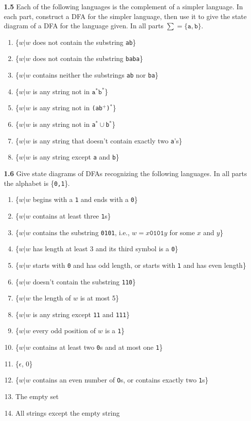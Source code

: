 \documentclass{article}
\begin{document}
\textbf{1.5} Each of the following languages is the complement of a simpler
language. In each part, construct a DFA for the simpler language, then use it to
give the state diagram of a DFA for the language given. In all parts $\sum =
\{\texttt{a}, \texttt{b}\}$.

\begin{enumerate}
\item \{$w|w$ does not contain the substring \texttt{ab}\}
\item \{$w|w$ does not contain the substring \texttt{baba}\}
\item \{$w|w$ contains neither the substrings \texttt{ab} nor \texttt{ba}\}
\item \{$w|w$ is any string not in $\texttt{a}^* \texttt{b}^*$\}
\item \{$w|w$ is any string not in \texttt{(ab$^+$)$^*$}\}
\item \{$w|w$ is any string not in \texttt{a$^*\cup$b$^*$}\}
\item \{$w|w$ is any string that doesn't contain exactly two \texttt{a}'s\}
\item \{$w|w$ is any string except \texttt{a} and \texttt{b}\}
\end{enumerate}

\textbf{1.6} Give state diagrams of DFAs recognizing the following languages. In
all parts the alphabet is \{\texttt{0,1}\}.

\begin{enumerate}
\item \{$w|w$ begins with a \texttt{1} and ends with a \texttt{0}\}
\item \{$w|w$ contains at least three \texttt{1}s\}
\item \{$w|w$ contains the substring \texttt{0101}, i.e., $w = x\texttt{0101}y$
for some $x$ and $y$\}
\item \{$w|w$ has length at least 3 and its third symbol is a \texttt{0}\}
\item \{$w|w$ starts with \texttt{0} and has odd length, or starts with
\texttt{1} and has even length\}
\item \{$w|w$ doesn't contain the substring \texttt{110}\}
\item \{$w|w$ the length of $w$ is at most 5\}
\item \{$w|w$ is any string except \texttt{11} and \texttt{111}\}
\item \{$w|w$ every odd position of $w$ is a \texttt{1}\}
\item \{$w|w$ contains at least two \texttt{0}s and at most one \texttt{1}\}
\item \{$\epsilon$, $0$\}
\item \{$w|w$ contains an even number of \texttt{O}s, or contains exactly two
\texttt{1}s\}
\item The empty set
\item All strings except the empty string
\end{enumerate}
\end{document}
